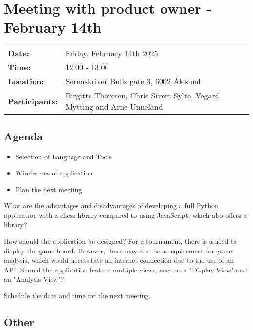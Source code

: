 \section{Meeting with product owner - February 14th}
\begin{tabular}{ll}
    \textbf{Date:} & Friday, February 14th 2025 \\
    \textbf{Time:} & 12.00 - 13.00\\
    \textbf{Location:} & Sorenskriver Bulls gate 3, 6002 Ålesund \\
    \textbf{Participants:} & Birgitte Thoresen, Chris Sivert Sylte, Vegard Mytting and Arne Unneland\\
\end{tabular}

\vspace{0.5cm}

\subsection{Agenda}

\begin{itemize}
    \item Selection of Language and Tools
    \item Wireframes of application
    \item Plan the next meeting
\end{itemize}

What are the advantages and disadvantages of developing a full Python application with a chess library compared to using JavaScript, which also offers a library?

How should the application be designed? For a tournament, there is a need to display the game board. However, there may also be a requirement for game analysis, which would necessitate an internet connection due to the use of an API. Should the application feature multiple views, such as a "Display View" and an "Analysis View"?

Schedule the date and time for the next meeting.

\subsection{Other}